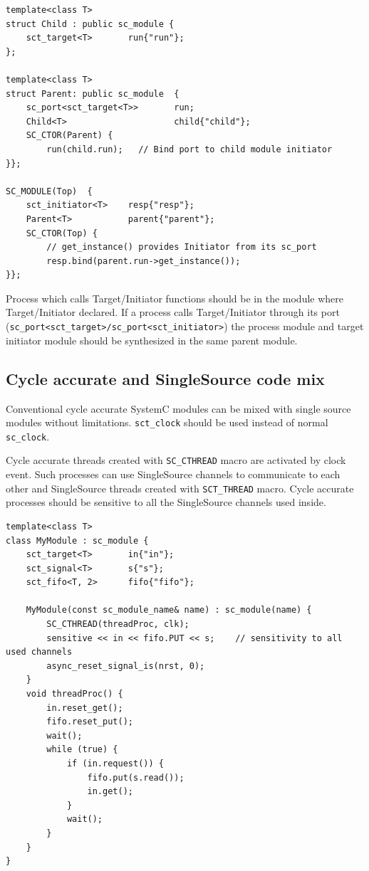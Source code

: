 \begin{lstlisting}[style=mycpp]
template<class T>
struct Child : public sc_module {
    sct_target<T>       run{"run"};
};

template<class T>
struct Parent: public sc_module  {
    sc_port<sct_target<T>>       run;   
    Child<T>                     child{"child"}; 
    SC_CTOR(Parent) {
        run(child.run);   // Bind port to child module initiator
}};

SC_MODULE(Top)  {
    sct_initiator<T>    resp{"resp"};
    Parent<T>           parent{"parent"};
    SC_CTOR(Top) {
        // get_instance() provides Initiator from its sc_port  
        resp.bind(parent.run->get_instance());   
}};
\end{lstlisting}
%
Process which calls Target/Initiator functions should be in the module where Target/Initiator declared. If a process calls Target/Initiator through its port ({\tt sc\_port<sct\_target>/sc\_port<sct\_initiator>}) the process module and target initiator module should be synthesized in the same parent module.

\subsection{Cycle accurate and SingleSource code mix}

Conventional cycle accurate SystemC modules can be mixed with single source modules without limitations. {\tt sct\_clock} should be used instead of normal {\tt sc\_clock}.

Cycle accurate threads created with {\tt SC\_CTHREAD} macro are activated by clock event. Such processes can use SingleSource channels to communicate to each other and SingleSource threads created with {\tt SCT\_THREAD} macro. Cycle accurate processes should be sensitive to all the SingleSource channels used inside.

\begin{lstlisting}[style=mycpp]
template<class T>
class MyModule : sc_module {
    sct_target<T>       in{"in"};
    sct_signal<T>       s{"s"};
    sct_fifo<T, 2>      fifo{"fifo"};

    MyModule(const sc_module_name& name) : sc_module(name) {
        SC_CTHREAD(threadProc, clk);
        sensitive << in << fifo.PUT << s;    // sensitivity to all used channels
        async_reset_signal_is(nrst, 0);
    }
    void threadProc() {
        in.reset_get();
        fifo.reset_put();
        wait();
        while (true) {
            if (in.request()) {
                fifo.put(s.read()); 
                in.get();
            }
            wait();
        }
    }
}
\end{lstlisting}

